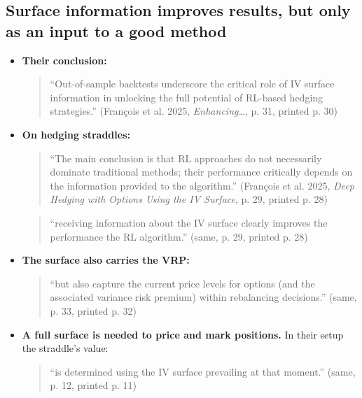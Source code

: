 \documentclass{article}
\begin{document}
\subsection{Surface information improves results, but only as an input to a good method}

\begin{itemize}

\item \textbf{Their conclusion:}

\begin{quote}``Out-of-sample backtests underscore the critical role of IV surface information in unlocking the full potential of RL-based hedging strategies.'' (François et al. 2025, \emph{Enhancing\ldots{}}, p. 31, printed p. 30)\end{quote}

\item \textbf{On hedging straddles:}

\begin{quote}``The main conclusion is that RL approaches do not necessarily dominate traditional methods; their performance critically depends on the information provided to the algorithm.'' (François et al. 2025, \emph{Deep Hedging with Options Using the IV Surface}, p. 29, printed p. 28)\end{quote}

\begin{quote}``receiving information about the IV surface clearly improves the performance the RL algorithm.'' (same, p. 29, printed p. 28)\end{quote}

\item \textbf{The surface also carries the VRP:}

\begin{quote}``but also capture the current price levels for options (and the associated variance risk premium) within rebalancing decisions.'' (same, p. 33, printed p. 32)\end{quote}

\item \textbf{A full surface is needed to price and mark positions.} In their setup the straddle's value:

\begin{quote}``is determined using the IV surface prevailing at that moment.'' (same, p. 12, printed p. 11)\end{quote}

\end{itemize}
\end{document}
